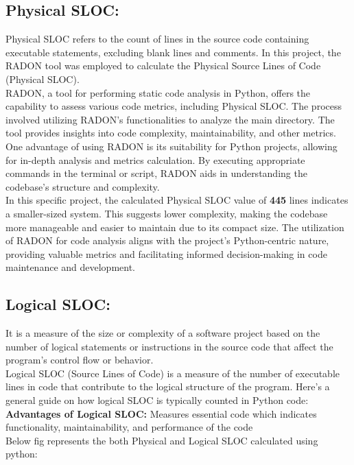 {{\subsection{Physical SLOC: }
\normalsize{Physical SLOC refers to the count of lines in the source code containing executable statements, excluding blank lines and comments. In this project, the RADON tool was employed to calculate the Physical Source Lines of Code (Physical SLOC). \linebreak \\ 
RADON, a tool for performing static code analysis in Python, offers the capability to assess various code metrics, including Physical SLOC. The process involved utilizing RADON's functionalities to analyze the main directory. The tool provides insights into code complexity, maintainability, and other metrics. \linebreak \\
One advantage of using RADON is its suitability for Python projects, allowing for in-depth analysis and metrics calculation. By executing appropriate commands in the terminal or script, RADON aids in understanding the codebase's structure and complexity. \linebreak \\
In this specific project, the calculated Physical SLOC value of \textbf{445} lines indicates a smaller-sized system. This suggests lower complexity, making the codebase more manageable and easier to maintain due to its compact size. The utilization of RADON for code analysis aligns with the project's Python-centric nature, providing valuable metrics and facilitating informed decision-making in code maintenance and development. }

\subsection{Logical SLOC: }
\normalsize{It is a measure of the size or complexity of a software project based on the number of logical statements or instructions in the source code that affect the program’s control flow or behavior.\linebreak \\
Logical SLOC (Source Lines of Code) is a measure of the number of executable lines in code that contribute to the logical structure of the program. Here's a general guide on how logical SLOC is typically counted in Python code: \linebreak \\
\textbf{Advantages of Logical SLOC: }Measures essential code which indicates functionality, maintainability, and performance of the code \linebreak \\
Below fig represents the both Physical and Logical SLOC calculated using python:
}


}}

